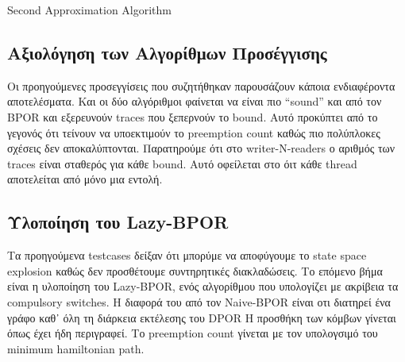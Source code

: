 \begin{algorithm}[H]
    \caption{Second Approximation Algorithm}
\end{algorithm}

\subsection{Αξιολόγηση των Αλγορίθμων Προσέγγισης}
Οι προηγούμενες προσεγγίσεις που συζητήθηκαν παρουσάζουν κάποια ενδιαφέροντα αποτελέσματα. Και οι δύο αλγόριθμοι φαίνεται να είναι πιο 
``sound'' και από τον BPOR και εξερευνούν traces που ξεπερνούν το bound. Αυτό προκύπτει από το γεγονός ότι τείνουν να
υποεκτιμούν το preemption count καθώς πιο πολύπλοκες σχέσεις δεν αποκαλύπτονται.
Παρατηρούμε ότι στο writer-N-readers ο αριθμός των traces είναι σταθερός για κάθε bound. Αυτό οφείλεται στο όιτ κάθε thread αποτελείται από μόνο 
μια εντολή.


\subsection{Υλοποίηση του Lazy-BPOR}

Τα προηγούμενα testcases δείξαν ότι μπορύμε να αποφύγουμε το state space explosion καθώς δεν προσθέτουμε συντηρητικές διακλαδώσεις.
Το επόμενο βήμα είναι η υλοποίηση του Lazy-BPOR, ενός αλγορίθμου που υπολογίζει με ακρίβεια τα compulsory switches.
Η διαφορά του από τον Naive-BPOR είναι οτι διατηρεί ένα γράφο καθ᾽ όλη τη διάρκεια εκτέλεσης του DPOR
Η προσθήκη των κόμβων γίνεται όπως έχει ήδη περιγραφεί.
Το preemption count γίνεται με τον υπολογσιμό του minimum hamiltonian path.

